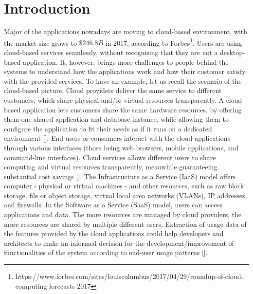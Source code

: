 \section{Introduction}\label{sec:Introduction}
%
Major of the applications nowadays are moving to cloud-based environment, with the market size grows to $\$246.8B$ in 2017, according to Forbes\footnote{https://www.forbes.com/sites/louiscolumbus/2017/04/29/roundup-of-cloud-computing-forecasts-2017}. Users are using cloud-based services seamlessly, without recognising that they are not a desktop-based application. It, however, brings more challenges to people behind the systems to understand how the applications work and how their customer satisfy with the provided services. To have an example, let us recall the scenario of the cloud-based picture. Cloud providers deliver the same service to different customers, which share physical and/or virtual resources transparently. A cloud-based application lets customers share the same hardware resources, by offering them one shared application and database instance, while allowing them to configure the application to fit their needs as if it runs on a dedicated environment []. End-users or consumers interact with the cloud applications through various interfaces (those being web browsers, mobile applications, and command-line interfaces). Cloud services allows different users to share computing and virtual resources transparently, meanwhile guaranteeing substantial cost savings []. The Infrastructure as a Service (IaaS) model offers computer - physical or virtual machines - and other resources, such as raw block storage, file or object storage, virtual local area networks (VLANs), IP addresses, and firewalls. In the Software as a Service (SaaS) model, users can access applications and data. The more resources are managed by cloud providers, the more resources are shared by multiple different users. Extraction of usage data of the features provided by the cloud applications could help developers and architects to make an informed decision for the development/improvement of functionalities of the system according to end-user usage patterns []. 

